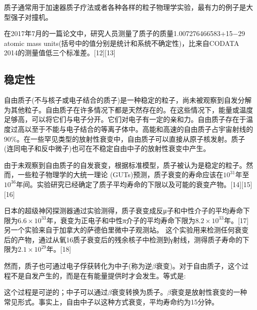 质子通常用于加速器质子疗法或者各种各样的粒子物理学实验，最有力的例子是大型强子对撞机。

在2017年7月的一篇论文中，研究人员测量了质子的质量1.007276466583+15−29 atomic mass units(括号中的值分别是统计和系统不确定性)，比来自CODATA 2014的测量值低三个标准差。[12][13]

\subsection{稳定性}
自由质子(不与核子或电子结合的质子)是一种稳定的粒子，尚未被观察到自发分解为其他粒子。自由质子在许多情况下都是天然存在的。在这些情况下，能量或温度足够高，可以将它们与电子分开。它们对电子有一定的亲和力。自由质子存在于温度过高以至于不能与电子结合的等离子体中。高能和高速的自由质子占宇宙射线的90\%。在一些罕见类型的放射性衰变中，自由质子可以直接从原子核发射。质子(连同电子和反中微子)也可在不稳定自由中子的放射性衰变中产生。

由于未观察到自由质子的自发衰变，根据标准模型，质子被认为是稳定的粒子。然而，一些粒子物理学的大统一理论 (GUTs)预测，质子衰变的寿命应该在$10^{31}$年至$10^{36}$年间。实验研究已经确定了质子平均寿命的下限以及可能的衰变产物。[14][15][16]

日本的超级神冈探测器通过实验测得，质子衰变成反μ子和中性介子的平均寿命下限为$6.6\times10^{33}$年，衰变为正电子和中性π介子的平均寿命下限为$8.2\times10^{33}$年。[17]另一个实验来自于加拿大的萨德伯里微中子观测站。 这个实验用来检测任何衰变后的产物，通过从氧16质子衰变后的残余核子中检测到γ射线，测得质子寿命的下限为$2.1\times10^{29}$年。[18]

然而，质子也可通过电子俘获转化为中子(称为逆$\beta$衰变)。对于自由质子，这个过程不是自发产生的，而是在有能量提供时才会发生。等式是:

这个过程是可逆的；中子可以通过$\beta$衰变转换为质子。$\beta$衰变是放射性衰变的一种常见形式。事实上，自由中子以这种方式衰变，平均寿命约为15分钟。

















